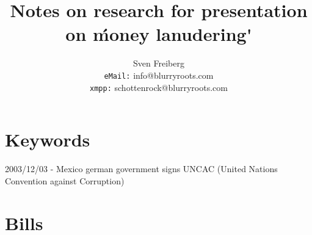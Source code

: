 \documentclass{article}
\begin{document}
\title{Notes on research for presentation on \'money lanudering\'}
\author{Sven Freiberg\\
\texttt{eMail:} info@blurryroots.com\\
\texttt{xmpp:} schottenrock@blurryroots.com}
\maketitle

\tableofcontents
\newpage

\part[Keywords]{Keywords}
2003/12/03 - Mexico german government signs UNCAC (United Nations Convention against Corruption)


\part[Bills]{Bills}
\end{document}

